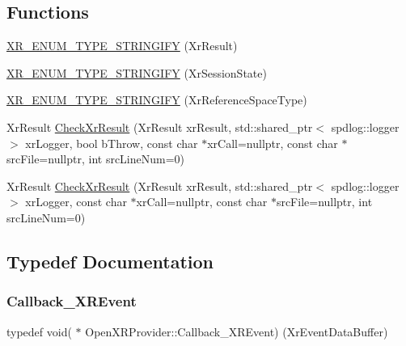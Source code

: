 \subsection*{Functions}
\begin{DoxyCompactItemize}
\item 
\mbox{\hyperlink{namespace_open_x_r_provider_ac8e3913afbac23d15ac8ade017abd1c2}{X\+R\+\_\+\+E\+N\+U\+M\+\_\+\+T\+Y\+P\+E\+\_\+\+S\+T\+R\+I\+N\+G\+I\+FY}} (Xr\+Result)
\item 
\mbox{\hyperlink{namespace_open_x_r_provider_a6f1b32985dfebfddc5f58fd4d9f520fd}{X\+R\+\_\+\+E\+N\+U\+M\+\_\+\+T\+Y\+P\+E\+\_\+\+S\+T\+R\+I\+N\+G\+I\+FY}} (Xr\+Session\+State)
\item 
\mbox{\hyperlink{namespace_open_x_r_provider_a0605c743043a3b939637dc328150c659}{X\+R\+\_\+\+E\+N\+U\+M\+\_\+\+T\+Y\+P\+E\+\_\+\+S\+T\+R\+I\+N\+G\+I\+FY}} (Xr\+Reference\+Space\+Type)
\item 
Xr\+Result \mbox{\hyperlink{namespace_open_x_r_provider_a832e6cc66984ff274e355f5771a04f57}{Check\+Xr\+Result}} (Xr\+Result xr\+Result, std\+::shared\+\_\+ptr$<$ spdlog\+::logger $>$ xr\+Logger, bool b\+Throw, const char $\ast$xr\+Call=nullptr, const char $\ast$src\+File=nullptr, int src\+Line\+Num=0)
\item 
Xr\+Result \mbox{\hyperlink{namespace_open_x_r_provider_a9e6665bb283f00adb11c3c4ee57c05dd}{Check\+Xr\+Result}} (Xr\+Result xr\+Result, std\+::shared\+\_\+ptr$<$ spdlog\+::logger $>$ xr\+Logger, const char $\ast$xr\+Call=nullptr, const char $\ast$src\+File=nullptr, int src\+Line\+Num=0)
\end{DoxyCompactItemize}


\subsection{Typedef Documentation}
\mbox{\label{namespace_open_x_r_provider_a23b2e01bea1c0c0d762560792d8dff0f}} 
\subsubsection{\texorpdfstring{Callback\_XREvent}{Callback\_XREvent}}
{\footnotesize\ttfamily typedef void( $\ast$ Open\+X\+R\+Provider\+::\+Callback\+\_\+\+X\+R\+Event) (Xr\+Event\+Data\+Buffer)}



